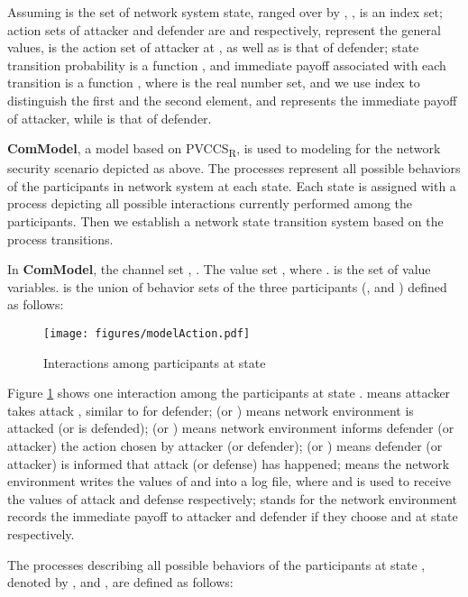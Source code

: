 \documentclass{acm_proc_article-sp}
\begin{document}
Assuming  is the set of network system state, ranged over by , ,  is an index set; action sets of attacker and defender are  and  respectively,  represent the general values,   is the action set of attacker at , as well as  is that of defender; state transition probability is a function , and immediate payoff associated with each transition is a function , where  is the real number set, and we use index to distinguish the first and the second element, and  represents the immediate payoff of attacker, while  is that of defender.

\textbf{ComModel}, a model based on PVCCS\textsubscript{R}, is used to modeling for the network security scenario depicted as above. The processes represent all possible behaviors of the participants in network system at each state. Each state is assigned with a process depicting all possible interactions currently performed among the participants. Then we establish a network state transition system based on the process transitions.

In \textbf{ComModel}, the channel set   , . The value set , where .  is the set of value variables.   is the union of behavior sets of the three participants (, and ) defined as follows:


\begin{figure}[!htpb]
\begin{center}
\texttt{[image: figures/modelAction.pdf]}
\caption{Interactions among participants at state }
\label{interactions}
\end{center}
\end{figure}
Figure \ref{interactions} shows one interaction among the participants at state .  means attacker takes attack , similar to  for defender;  (or ) means network environment is attacked (or is defended);  (or ) means network environment informs defender (or attacker) the action chosen by attacker (or defender);  (or ) means defender (or attacker) is informed that attack (or defense) has happened;  means the network environment writes the values of  and  into a log file, where  and  is used to receive the values of  attack and defense respectively;  stands for the network environment records the immediate payoff to attacker and defender if they choose  and  at state  respectively.

The processes describing all possible behaviors of the participants at state , denoted by ,  and , are defined as follows:
\end{document}
